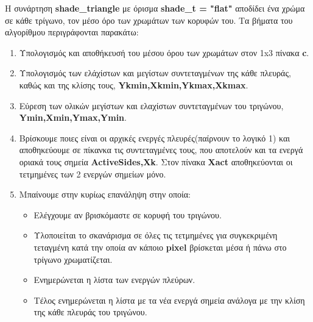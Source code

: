 \documentclass[10pt,a4paper]{article}
\begin{document}
Η συνάρτηση \textbf{\textlatin{shade\_triangle}} με όρισμα \textbf{\textlatin{shade\_t = "flat"}} αποδίδει ένα χρώμα σε κάθε τρίγωνο, τον μέσο όρο των χρωμάτων των κορυφών του. Τα βήματα του αλγορίθμου περιγράφονται παρακάτω: 
\begin{enumerate}
    \item Υπολογισμός και αποθήκευσή του μέσου όρου των χρωμάτων στον 1\textlatin{x}3 πίνακα \textbf{\textlatin{c}}.
    \item Υπολογισμός των ελάχίστων και μεγίστων συντεταγμένων της κάθε πλευράς,  καθώς και της κλίσης τους, \textbf{\textlatin{Ykmin,Xkmin,Ykmax,Xkmax}}.
    \item Εύρεση των ολικών μεγίστων και ελαχίστων συντεταγμένων του τριγώνου, \textbf{\textlatin{Ymin,Xmin,Ymax,Ymin}}.
    \item Βρίσκουμε ποιες είναι οι αρχικές ενεργές πλευρές(παίρνουν το λογικό 1) και αποθηκεύουμε σε πίκανκα τις συντεταγμένες τους, που αποτελούν και τα ενεργά οριακά τους σημεία \textbf{\textlatin{ActiveSides,Xk}}. Στον πίνακα \textbf{\textlatin{Xact}} αποθηκεύονται οι τετμημένες των 2 ενεργών σημείων μόνο.
    \item Μπαίνουμε στην κυρίως επανάληψη στην οποία:
    \begin{itemize}
        \item Ελέγχουμε αν βρισκόμαστε σε κορυφή του τριγώνου.
        \item Υλοποιείται το σκανάρισμα σε όλες τις τετμημένες για συγκεκριμένη τεταγμένη κατά την οποία αν κάποιο \textbf{\textlatin{pixel}} βρίσκεται μέσα ή πάνω στο τρίγωνο χρωματίζεται.
        \item Ενημερώνεται η λίστα των ενεργών πλεύρων.
        \item Τέλος ενημερώνεται η λίστα με τα νέα ενεργά σημεία ανάλογα με την κλίση της κάθε πλευράς του τριγώνου.
      \end{itemize}
  \end{enumerate}
\end{document}

